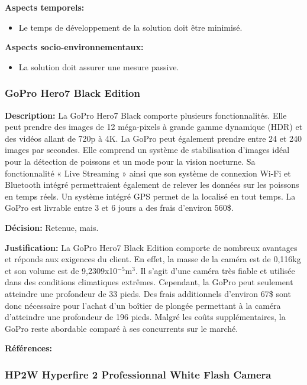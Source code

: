 \textbf{Aspects temporels:}
\begin{itemize}[label = {--}]
    \item Le temps de développement de la solution doit être minimisé.
\end{itemize}

\textbf{Aspects socio-environnementaux:}
\begin{itemize}[label = {--}]
    \item La solution doit assurer une mesure passive.
\end{itemize}

\subsubsection{GoPro Hero7 Black Edition}

\textbf{Description:} La GoPro Hero7 Black comporte plusieurs fonctionnalités. Elle peut prendre des images de 12 méga-pixels à grande gamme dynamique (HDR) et des vidéos allant de 720p à 4K. La GoPro peut également prendre entre 24 et 240 images par secondes. Elle comprend un système de stabilisation d'images idéal pour la détection de poissons et un mode pour la vision nocturne. Sa fonctionnalité « Live Streaming » ainsi que son système de connexion Wi-Fi et Bluetooth intégré permettraient également de relever les données sur les poissons en temps réels. Un système intégré GPS permet de la localisé en tout temps. La GoPro est livrable entre 3 et 6 jours a des frais d'environ 560\$. \vspace{5mm}

\textbf{Décision:} Retenue, mais. \vspace{5mm}

\textbf{Justification:} La GoPro Hero7 Black Edition comporte de nombreux avantages et réponds aux exigences du client. En effet, la masse de la caméra est de 0,116kg et son volume est de 9,2309x10$^{-5}$m$^3$. Il s'agit d'une caméra très fiable et utilisée dans des conditions climatiques extrêmes. Cependant, la GoPro peut seulement atteindre une profondeur de 33 pieds. Des frais additionnels d'environ 67\$ sont donc nécessaire pour l'achat d'un boîtier de plongée permettant à la caméra d'atteindre une profondeur de 196 pieds. Malgré les coûts supplémentaires, la GoPro reste abordable comparé à ses concurrents sur le marché. \vspace{5mm}

\textbf{Références:} \cite{GoPro_Specs} \cite{GoPro_Waterproof}


\subsubsection{HP2W Hyperfire 2 Professionnal White Flash Camera}
\label{subsubsectionHyperfire}

